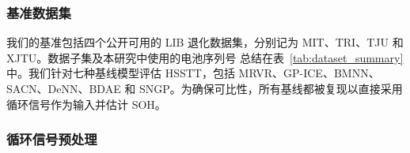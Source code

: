 \documentclass[UTF8,journal,twoside,web]{ieeecolor}
\begin{document}
\subsubsection{基准数据集}\label{subsubsec:benchmarks}
我们的基准包括四个公开可用的 LIB 退化数据集，分别记为 MIT\cite{mit_dataset_attia2020closed}、TRI\cite{tri_dataset_severson2019data}、TJU\cite{tongji_dataset_zhu2022data} 和 XJTU\cite{WANG2024109884}。数据子集及本研究中使用的电池序列号\cite{WANG2024110325} 总结在表~\ref{tab:dataset_summary} 中。我们针对七种基线模型评估 HSSTT，包括 MRVR\cite{rvr_rul_9552552}、GP-ICE\cite{gpr_soh_8263147}、BMNN\cite{bbb_rul_9738999}、SACN\cite{capsnet_rul_li2024sensor}、DeNN\cite{ensemble2_soh_10102497}、BDAE\cite{mcdropout_autoencoder_10412192} 和 SNGP\cite{nemani2023uncertainty}。为确保可比性，所有基线都被复现以直接采用循环信号作为输入并估计 SOH。

\subsubsection{循环信号预处理}\label{subsubsec:cyclic_signal_preprocess}
\end{document}
